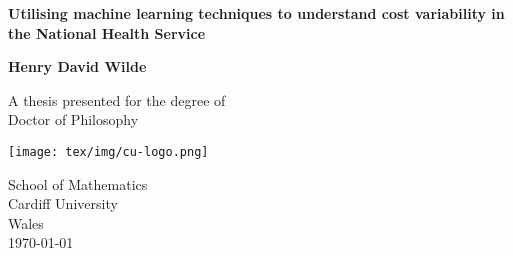 \begin{titlepage}

    \begin{center}
        \vspace*{1cm}

        \Large
        \textbf{Utilising machine learning techniques to understand cost
        variability in the National Health Service}

        \vspace{2.5cm}
        \large
        \textbf{Henry David Wilde}

        \vfill

        A thesis presented for the degree of\\
        Doctor of Philosophy

        \vspace{0.8cm}

        \texttt{[image: tex/img/cu-logo.png]}

        School of Mathematics\\
        Cardiff University\\
        Wales\\
        \today

    \end{center}
\end{titlepage}

